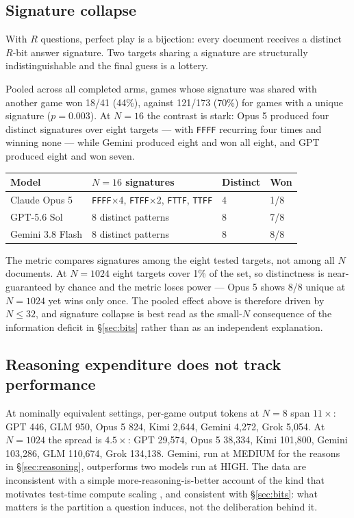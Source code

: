 \documentclass[11pt]{article}
\begin{document}
\subsection{Signature collapse}

With $R$ questions, perfect play is a bijection: every document receives a
distinct $R$-bit answer signature. Two targets sharing a signature are
structurally indistinguishable and the final guess is a lottery.

Pooled across all completed arms, games whose signature was shared with another
game won 18/41 (44\%), against 121/173 (70\%) for games with a unique signature
($p=0.003$). At $N{=}16$ the contrast is stark: Opus 5 produced four distinct
signatures over eight targets --- with \texttt{FFFF} recurring four times and
winning none --- while Gemini produced eight and won all eight, and GPT produced
eight and won seven.

\begin{table}[h]
\centering\small
\begin{tabular}{llll}
\toprule
Model & $N{=}16$ signatures & Distinct & Won \\
\midrule
Claude Opus 5 & \texttt{FFFF}$\times$4, \texttt{FTFF}$\times$2,
  \texttt{FTTF}, \texttt{TTFF} & 4 & 1/8 \\
GPT-5.6 Sol & 8 distinct patterns & 8 & 7/8 \\
Gemini 3.8 Flash & 8 distinct patterns & 8 & 8/8 \\
\bottomrule
\end{tabular}
\end{table}

The metric compares signatures among the eight tested targets, not among all
$N$ documents. At $N=1024$ eight targets cover
1\% of the set, so distinctness is near-guaranteed by chance and the metric
loses power --- Opus 5 shows 8/8 unique at $N=1024$ yet wins only once. The
pooled effect above is therefore driven by $N \le 32$, and signature collapse is
best read as the small-$N$ consequence of the information deficit in
\S\ref{sec:bits} rather than as an independent explanation.

\subsection{Reasoning expenditure does not track performance}
\label{sec:trace}

At nominally equivalent settings, per-game output tokens at $N{=}8$ span
$11\times$: GPT 446, GLM 950, Opus 5 824, Kimi 2{,}644, Gemini 4{,}272, Grok
5{,}054. At $N{=}1024$ the spread is $4.5\times$: GPT 29{,}574, Opus 5 38{,}334,
Kimi 101{,}800, Gemini 103{,}286, GLM 110{,}674, Grok 134{,}138. Gemini, run at
MEDIUM for the reasons in \S\ref{sec:reasoning}, outperforms two models run at
HIGH. The data are inconsistent with a simple more-reasoning-is-better account
of the kind that motivates test-time compute scaling
\citep{wei2022cot,snell2024}, and consistent with \S\ref{sec:bits}: what matters
is the partition a question induces, not the deliberation behind it.
\end{document}

